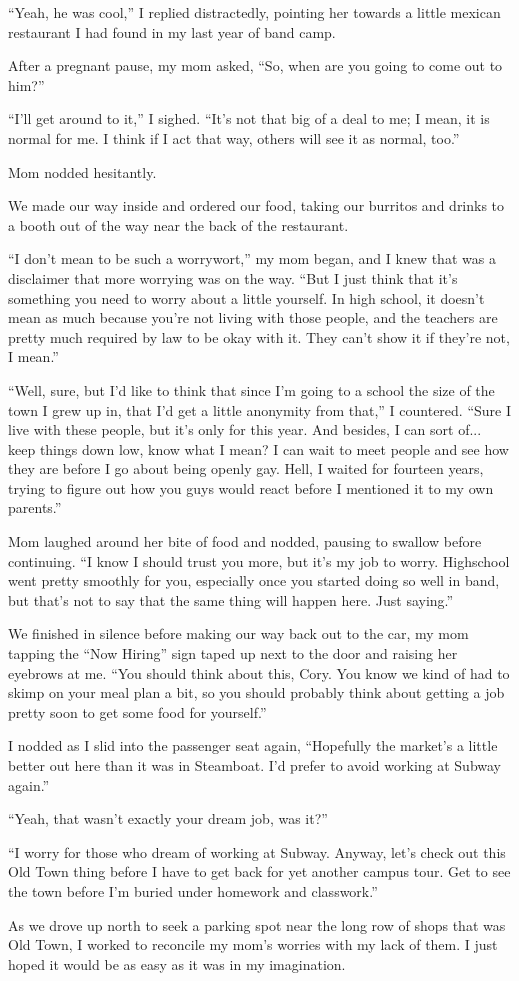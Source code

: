 ``Yeah, he was cool,'' I replied distractedly, pointing her towards a little mexican restaurant I had found in my last year of band camp.

After a pregnant pause, my mom asked, ``So, when are you going to come out to him?''

``I'll get around to it,'' I sighed.  ``It's not that big of a deal to me; I mean, it is normal for me.  I think if I act that way, others will see it as normal, too.''

Mom nodded hesitantly.

We made our way inside and ordered our food, taking our burritos and drinks to a booth out of the way near the back of the restaurant.

``I don't mean to be such a worrywort,'' my mom began, and I knew that was a disclaimer that more worrying was on the way.  ``But I just think that it's something you need to worry about a little yourself.  In high school, it doesn't mean as much because you're not living with those people, and the teachers are pretty much required by law to be okay with it.  They can't show it if they're not, I mean.''

``Well, sure, but I'd like to think that since I'm going to a school the size of the town I grew up in, that I'd get a little anonymity from that,'' I countered.  ``Sure I live with these people, but it's only for this year.  And besides, I can sort of... keep things down low, know what I mean?  I can wait to meet people and see how they are before I go about being openly gay.  Hell, I waited for fourteen years, trying to figure out how you guys would react before I mentioned it to my own parents.''

Mom laughed around her bite of food and nodded, pausing to swallow before continuing.  ``I know I should trust you more, but it's my job to worry.  Highschool went pretty smoothly for you, especially once you started doing so well in band, but that's not to say that the same thing will happen here.  Just saying.''

We finished in silence before making our way back out to the car, my mom tapping the ``Now Hiring'' sign taped up next to the door and raising her eyebrows at me.  ``You should think about this, Cory.  You know we kind of had to skimp on your meal plan a bit, so you should probably think about getting a job pretty soon to get some food for yourself.''

I nodded as I slid into the passenger seat again, ``Hopefully the market's a little better out here than it was in Steamboat.  I'd prefer to avoid working at Subway again.''

``Yeah, that wasn't exactly your dream job, was it?''

``I worry for those who dream of working at Subway.  Anyway, let's check out this Old Town thing before I have to get back for yet another campus tour.  Get to see the town before I'm buried under homework and classwork.''

As we drove up north to seek a parking spot near the long row of shops that was Old Town, I worked to reconcile my mom's worries with my lack of them.  I just hoped it would be as easy as it was in my imagination.
